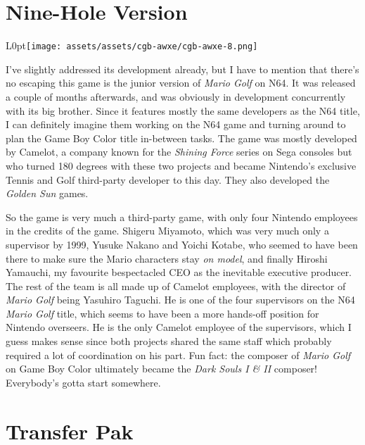 \documentclass{book}
\begin{document}
\FloatBarrier\vspace{\baselineskip}\begin{figure}[H]\end{figure}
\FloatBarrier\section*{Nine-Hole Version}
\begin{wrapfigure}{L}{0pt}{\texttt{[image: assets/assets/cgb-awxe/cgb-awxe-8.png]}}\end{wrapfigure}\noindent
I’ve slightly addressed its development already, but I have to mention that there’s no escaping this game is the junior version of \emph{Mario Golf} on N64. It was released a couple of months afterwards, and was obviously in development concurrently with its big brother. Since it features mostly the same developers as the N64 title, I can definitely imagine them working on the N64 game and turning around to plan the Game Boy Color title in-between tasks. The game was mostly developed by Camelot, a company known for the \emph{Shining Force} series on Sega consoles but who turned 180 degrees with these two projects and became Nintendo’s exclusive Tennis and Golf third-party developer to this day. They also developed the \emph{Golden Sun} games.\par
So the game is very much a third-party game, with only four Nintendo employees in the credits of the game. Shigeru Miyamoto, which was very much only a supervisor by 1999, Yusuke Nakano and Yoichi Kotabe, who seemed to have been there to make sure the Mario characters stay \emph{on model}, and finally Hiroshi Yamauchi, my favourite bespectacled CEO as the inevitable executive producer. The rest of the team is all made up of Camelot employees, with the director of \emph{Mario Golf} being Yasuhiro Taguchi. He is one of the four supervisors on the N64 \emph{Mario Golf} title, which seems to have been a more hands-off position for Nintendo overseers. He is the only Camelot employee of the supervisors, which I guess makes sense since both projects shared the same staff which probably required a lot of coordination on his part. Fun fact: the composer of \emph{Mario Golf} on Game Boy Color ultimately became the \emph{Dark Souls I \& II} composer! Everybody’s gotta start somewhere.\par
\FloatBarrier\section*{Transfer Pak}
\end{document}
